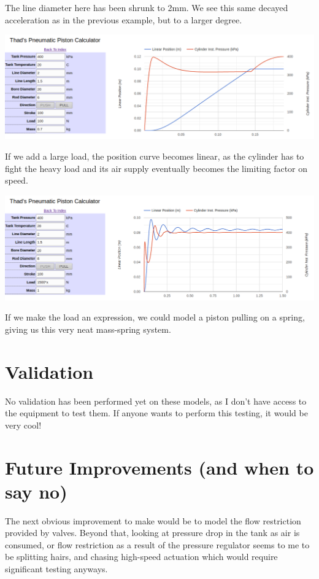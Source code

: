 \documentclass[10pt,letterpaper]{article}
\begin{document}
	The line diameter here has been shrunk to 2mm. We see this same decayed acceleration as in the previous example, but to a larger degree.
	
	\includegraphics[width=\textwidth]{pneu_case_5.png}
	
	If we add a large load, the position curve becomes linear, as the cylinder has to fight the heavy load and its air supply eventually becomes the limiting factor on speed.
	
	\includegraphics[width=\textwidth]{pneu_case_6.png}
	
	If we make the load an expression, we could model a piston pulling on a spring, giving us this very neat mass-spring system.
	
	\section*{Validation}
		No validation has been performed yet on these models, as I don't have access to the equipment to test them. If anyone wants to perform this testing, it would be very cool!
		
	\section*{Future Improvements (and when to say no)}
		The next obvious improvement to make would be to model the flow restriction provided by valves. Beyond that, looking at pressure drop in the tank as air is consumed, or flow restriction as a result of the pressure regulator seems to me to be splitting hairs, and chasing high-speed actuation which would require significant testing anyways.
	
	
\end{document}
